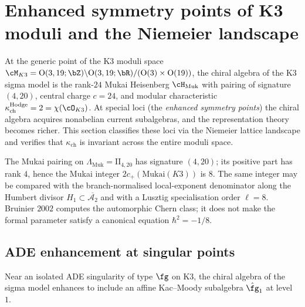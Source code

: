 \section{Enhanced symmetry points of K3 moduli and the Niemeier landscape}
\label{sec:k3-moduli-niemeier-landscape}

At the generic point of the K3 moduli space
$\cM_{K3} = \mathrm{O}(3,19;\bZ) \backslash \mathrm{O}(3,19;\bR) / (\mathrm{O}(3) \times \mathrm{O}(19))$,
the chiral algebra of the K3 sigma model is the rank-$24$ Mukai
Heisenberg $\cH_{\mathrm{Muk}}$ with pairing of signature $(4,20)$,
central charge $c = 24$, and modular characteristic
$\kappa_{\mathrm{ch}}^{\mathrm{Hodge}} = 2 = \chi(\cO_{K3})$.
At special loci (the \emph{enhanced symmetry points}) the
chiral algebra acquires nonabelian current subalgebras, and the
representation theory becomes richer. This section classifies these
loci via the Niemeier lattice landscape and verifies that
$\kappa_{\mathrm{ch}}$ is invariant across the entire moduli space.

\begin{remark}[Mukai doubling and the Koszul conductor \texorpdfstring{$K^{\kappa_{\mathrm{ch}}}=8$}{K-kappa-ch=8}]
\label{rem:k3ca-mukai-doubling}
The Mukai pairing on $\Lambda_{\mathrm{Muk}}=\mathrm{II}_{4,20}$ has signature $(4,20)$; its positive part has rank \(4\), hence the Mukai integer \(2c_+(\mathrm{Mukai}(K3))\) is \(8\). The same integer may be compared with the branch-normalised local-exponent denominator along the Humbert divisor \(H_1\subset\overline{\mathcal{A}_2}\) and with a Lusztig specialisation order \(\ell=8\). Bruinier \(2002\) computes the automorphic Chern class; it does not make the formal parameter satisfy a canonical equation \(\hbar^2=-1/8\).
\end{remark}

\subsection{ADE enhancement at singular points}
\label{subsec:k3-ade-enhancement}

Near an isolated ADE singularity of type $\fg$ on K3, the chiral
algebra of the sigma model enhances to include an affine
Kac--Moody subalgebra $\hat{\fg}_1$ at level~$1$.

